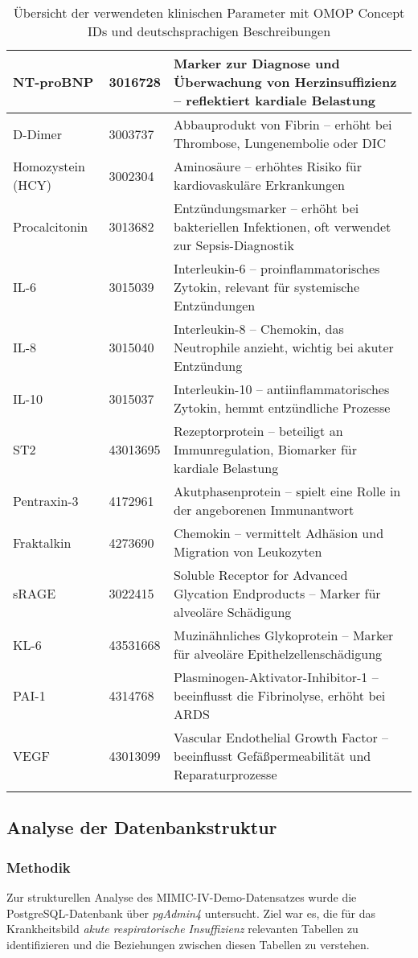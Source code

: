 \documentclass[12pt]{article}
\begin{document}
\begin{longtable}{|p{5cm}|p{3.5cm}|p{7.5cm}|}
\hline
NT-proBNP & 3016728 & Marker zur Diagnose und Überwachung von Herzinsuffizienz – reflektiert kardiale Belastung \\
\hline
D-Dimer & 3003737 & Abbauprodukt von Fibrin – erhöht bei Thrombose, Lungenembolie oder DIC \\
\hline
Homozystein (HCY) & 3002304 & Aminosäure – erhöhtes Risiko für kardiovaskuläre Erkrankungen \\
\hline
Procalcitonin & 3013682 & Entzündungsmarker – erhöht bei bakteriellen Infektionen, oft verwendet zur Sepsis-Diagnostik \\
\hline
IL-6 & 3015039 & Interleukin-6 – proinflammatorisches Zytokin, relevant für systemische Entzündungen \\
\hline
IL-8 & 3015040 & Interleukin-8 – Chemokin, das Neutrophile anzieht, wichtig bei akuter Entzündung \\
\hline
IL-10 & 3015037 & Interleukin-10 – antiinflammatorisches Zytokin, hemmt entzündliche Prozesse \\
\hline
ST2 & 43013695 & Rezeptorprotein – beteiligt an Immunregulation, Biomarker für kardiale Belastung \\
\hline
Pentraxin-3 & 4172961 & Akutphasenprotein – spielt eine Rolle in der angeborenen Immunantwort \\
\hline
Fraktalkin & 4273690 & Chemokin – vermittelt Adhäsion und Migration von Leukozyten \\
\hline
sRAGE & 3022415 & Soluble Receptor for Advanced Glycation Endproducts – Marker für alveoläre Schädigung \\
\hline
KL-6 & 43531668 & Muzinähnliches Glykoprotein – Marker für alveoläre Epithelzellenschädigung \\
\hline
PAI-1 & 4314768 & Plasminogen-Aktivator-Inhibitor-1 – beeinflusst die Fibrinolyse, erhöht bei ARDS \\
\hline
VEGF & 43013099 & Vascular Endothelial Growth Factor – beeinflusst Gefäßpermeabilität und Reparaturprozesse \\
\hline
\caption{Übersicht der verwendeten klinischen Parameter mit OMOP Concept IDs und deutschsprachigen Beschreibungen}
\label{tab:first_table}
\end{longtable}

\subsection{Analyse der Datenbankstruktur }

\subsubsection{Methodik}
Zur strukturellen Analyse des MIMIC-IV-Demo-Datensatzes wurde die PostgreSQL-Datenbank über \textit{pgAdmin4} untersucht. Ziel war es, die für das Krankheitsbild \textit{akute respiratorische Insuffizienz} relevanten Tabellen zu identifizieren und die Beziehungen zwischen diesen Tabellen zu verstehen. 
\end{document}
